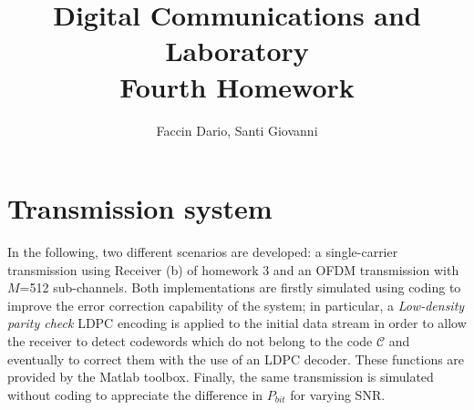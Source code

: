 \documentclass[a4paper, 12pt]{report}
\begin{document}
	
\title{Digital Communications and Laboratory \\ Fourth Homework}
\author{Faccin Dario, Santi Giovanni}
\date{}
\maketitle

\section*{Transmission system}
In the following, two different scenarios are developed: a single-carrier transmission using Receiver (b) of homework 3 and an OFDM transmission with $M$=512 sub-channels. Both implementations are firstly simulated using coding to improve the error correction capability of the system; in particular, a \textit{Low-density parity check} LDPC encoding is applied to the initial data stream in order to allow the receiver to detect codewords which do not belong to the code $\mathcal{C}$ and eventually to correct them with the use of an LDPC decoder. These functions are provided by the Matlab toolbox. Finally, the same transmission is simulated without coding to appreciate the difference in $P_{bit}$ for varying SNR.
\end{document}
